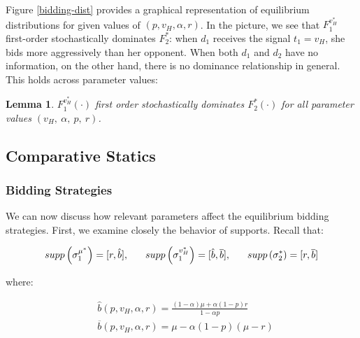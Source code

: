 \documentclass[11pt]{article}
\theoremstyle{plain}
\theoremstyle{definition}
\theoremstyle{plain}
\theoremstyle{plain}
\theoremstyle{plain}
\newtheorem{lem}[thm]{Lemma}
\theoremstyle{plain}
\numberwithin{equation}{section}
\begin{document}
\vspace{3mm}

\noindent Figure \ref{bidding-dist} provides a graphical representation of equilibrium distributions for given values of $ (p, v_H, \alpha, r) $. In the picture, we see that $ F_1^{v_H^*} $ first-order stochastically dominates $ F_2^* $: when $ d_1 $ receives the signal $ t_1 = v_H $, she bids more aggressively than her opponent. When both $ d_1 $ and $ d_2 $ have no information, on the other hand, there is no dominance relationship in general. This holds across parameter values:

\vspace{0.2cm}

\begin{lem}\label{lem:stoch}
$ F_1^{v_H^*}(\cdot) $ first order stochastically dominates $ F_2^*(\cdot) $ for all parameter values $(v_H,\ \alpha,\ p, \ r)$.
\end{lem}

\vspace{4mm}

\subsection{Comparative Statics}
\subsubsection{Bidding Strategies}
\noindent We can now discuss how relevant parameters affect the equilibrium bidding strategies. First, we examine closely the behavior of supports. Recall that:

\begin{equation*}
 supp\left( \sigma_1^{\mu^*} \right) = [r, \hat{b}], \hspace{0.6cm} supp\left( \sigma_1^{v_H^*} \right) = [\hat{b}, \overline{b}], \hspace{0.6cm} supp\left( \sigma_2^* \right) = [r, \overline{b}]
\end{equation*}

\vspace{0.2cm}

\noindent where:

\begin{align*}
 &\hat{b}(p, v_H, \alpha, r) = \frac{(1 - \alpha) \mu + \alpha (1 - p) r}{1 - \alpha p} \\[10pt]
 &\overline{b}(p, v_H, \alpha, r) = \mu - \alpha(1 - p)(\mu - r)
\end{align*}
\end{document}
